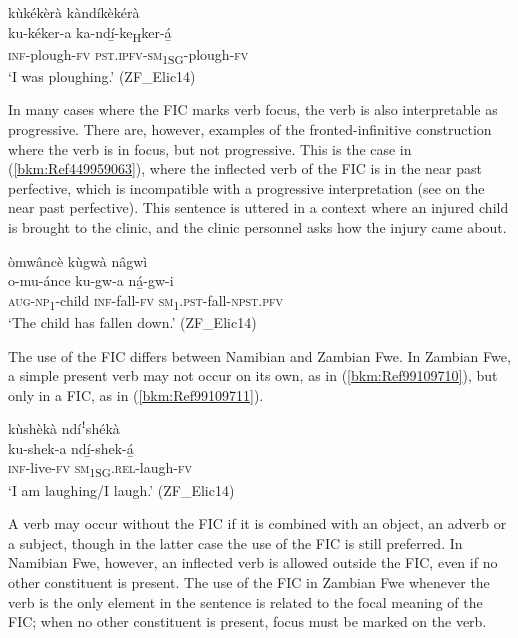 \ea
\label{bkm:Ref449958275}
kùkékèrà kàndíkèkérà\\
\gll ku-kéker-a    ka-ndí̲-ke\textsubscript{H}ker-á̲\\
\textsc{inf}-plough-\textsc{fv}  \textsc{pst}.\textsc{ipfv}-\textsc{sm}\textsubscript{1SG}-plough-\textsc{fv}\\
\glt ‘I was ploughing.’ (ZF\_Elic14)
\z

In many cases where the FIC marks verb focus, the verb is also interpretable as progressive. There are, however, examples of the fronted-infinitive construction where the verb is in focus, but not progressive. This is the case in (\ref{bkm:Ref449959063}), where the inflected verb of the FIC is in the near past perfective, which is incompatible with a progressive interpretation (see  on the near past perfective). This sentence is uttered in a context where an injured child is brought to the clinic, and the clinic personnel asks how the injury came about.

\ea
\label{bkm:Ref449959063}
òmwâncè kùgwà nâgwì\\
\gll o-mu-ánce    ku-gw-a  ná̲-gw-i\\
\textsc{aug}-\textsc{np}\textsubscript{1}-child  \textsc{inf}-fall-\textsc{fv}  \textsc{sm}\textsubscript{1}.\textsc{pst}-fall-\textsc{npst}.\textsc{pfv}\\
\glt ‘The child has fallen down.’ (ZF\_Elic14)
\z

The use of the FIC differs between Namibian and Zambian Fwe. In Zambian Fwe, a simple present verb may not occur on its own, as in (\ref{bkm:Ref99109710}), but only in a FIC, as in (\ref{bkm:Ref99109711}).

\z

\ea
\label{bkm:Ref99109711}
kùshèkà ndíꜝshékà\\
\gll ku-shek-a  ndí̲-shek-á̲\\
\textsc{inf}-live-\textsc{fv}  \textsc{sm}\textsubscript{1SG}.\textsc{rel}-laugh-\textsc{fv}\\
\glt ‘I am laughing/I laugh.’ (ZF\_Elic14)
\z

A verb may occur without the FIC if it is combined with an object, an adverb or a subject, though in the latter case the use of the FIC is still preferred. In Namibian Fwe, however, an inflected verb is allowed outside the FIC, even if no other constituent is present. The use of the FIC in Zambian Fwe whenever the verb is the only element in the sentence is related to the focal meaning of the FIC; when no other constituent is present, focus must be marked on the verb.

